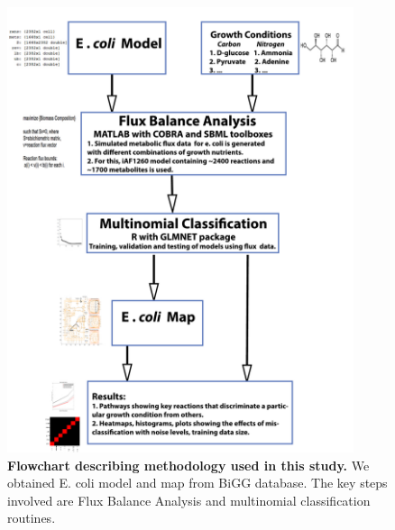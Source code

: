 \documentclass[12pt]{article}
\begin{document}
\clearpage
\begin{figure}[!ht]
\centerline{\includegraphics[width=4in]{Figures/flowchart_new.pdf}}
\caption{\label{fig:flowchart}\textbf{Flowchart describing methodology used in this study.} We obtained E. coli model and map from BiGG database. The key steps involved are Flux Balance Analysis and multinomial classification routines.}
\end{figure}
\end{document}
